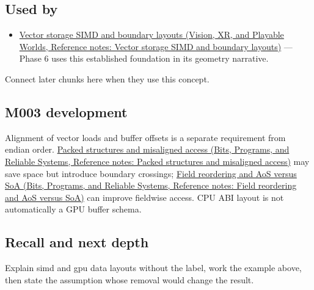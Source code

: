 \subsection{Used by}\label{appendix-3c7b1a56de01-used-by}

\hypertarget{appendix-3c7b1a56de01-used-by}{}

\begin{itemize}
\tightlist
\item
  \href{../07-Vision-XR-and-Playable-Worlds/main.pdf\#nameddest=appendix-26bf6bf2fb8b}{Vector storage SIMD and boundary layouts (Vision, XR, and Playable Worlds, Reference notes: Vector storage SIMD and boundary layouts)} --- Phase 6 uses this established foundation in its geometry narrative.
\end{itemize}

Connect later chunks here when they use this concept.

\subsection{M003 development}\label{appendix-3c7b1a56de01-m003-development}

\hypertarget{appendix-3c7b1a56de01-m003-development}{}

Alignment of vector loads and buffer offsets is a separate requirement from endian order. \href{../01-Bits-Programs-and-Reliable-Systems/main.pdf\#nameddest=appendix-0682dbfc5f0e}{Packed structures and misaligned access (Bits, Programs, and Reliable Systems, Reference notes: Packed structures and misaligned access)} may save space but introduce boundary crossings; \href{../01-Bits-Programs-and-Reliable-Systems/main.pdf\#nameddest=appendix-5522ad176ca0}{Field reordering and AoS versus SoA (Bits, Programs, and Reliable Systems, Reference notes: Field reordering and AoS versus SoA)} can improve fieldwise access. CPU ABI layout is not automatically a GPU buffer schema.

\subsection{Recall and next depth}\label{appendix-3c7b1a56de01-recall-and-next-depth}

\hypertarget{appendix-3c7b1a56de01-recall-and-next-depth}{}

Explain simd and gpu data layouts without the label, work the example above, then state the assumption whose removal would change the result.

